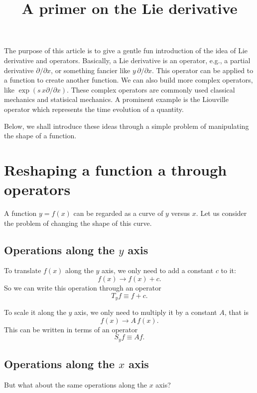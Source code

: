 \documentclass{article}
\begin{document}
\title{A primer on the Lie derivative}
\author{ \vspace{-10ex} }
\date{ \vspace{-10ex} }
\maketitle


The purpose of this article is to give a
gentle fun introduction
of the idea of Lie derivative and operators.
%
Basically, a Lie derivative is an operator,
e.g., a partial derivative $\partial/\partial x$,
or something fancier like $y \, \partial/\partial x$.
%
This operator can be applied to a function
to create another function.
%
We can also build more complex operators, like
$\exp(s \, x \partial/\partial x)$.
%
These complex operators are commonly used classical mechanics
and statisical mechanics.
%
A prominent example is the Liouville operator
which represents the time evolution of a quantity.


Below, we shall introduce these ideas through
a simple problem of manipulating the shape of a function.



\section{Reshaping a function a through operators}


A function $y = f(x)$ can be regarded as a curve of $y$ versus $x$.
Let us consider the problem of changing the shape of this curve.


\subsection{Operations along the $y$ axis}

To translate $f(x)$ along the $y$ axis,
we only need to add a constant $c$ to it:
$$
f(x) \rightarrow f(x) + c.
$$
So we can write this operation through an operator
$$
T_y f \equiv f + c.
$$

To scale it along the $y$ axis, we only need to multiply it
by a constant $A$, that is
$$
f(x) \rightarrow A \, f(x).
$$
This can be written in terms of an operator
$$
S_y f \equiv A f.
$$


\subsection{Operations along the $x$ axis}

But what about the same operations along the $x$ axis?
\end{document}
